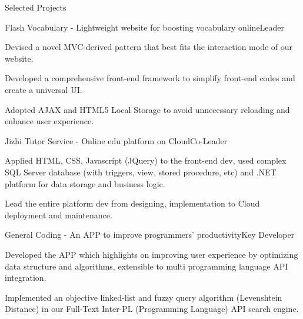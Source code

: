 \documentclass{resume} %
\begin{document}
\begin{rSection}{Selected Projects}

\begin{rSubsection}{Flash Vocabulary - Lightweight website for boosting vocabulary online}{Leader}{}{}
\item Devised a novel MVC-derived pattern that best fits the interaction mode of our website.
\item Developed a comprehensive front-end framework to simplify front-end codes and create a universal UI.
\item Adopted AJAX and HTML5 Local Storage to avoid unnecessary reloading and enhance user experience.
\end{rSubsection}


\begin{rSubsection}{Jizhi Tutor Service - Online edu platform on Cloud}{Co-Leader}{}{}
\item Applied HTML, CSS, Javascript (JQuery) to the front-end dev, used complex SQL Server database (with triggers, view, stored procedure, etc) and .NET platform for data storage and business logic.
\item Lead the entire platform dev from designing, implementation to Cloud deployment and maintenance.
\end{rSubsection}


\begin{rSubsection}{General Coding - An APP to improve programmers' productivity}{Key Developer}{}{}
\item Developed the APP which highlights on improving user experience by optimizing data structure and algorithms, extensible to multi programming language API integration.
\item Implemented an objective linked-list and fuzzy query algorithm (Levenshtein Distance) in our Full-Text
Inter-PL (Programming Language) API search engine.
\end{rSubsection}


\end{rSection}

\end{document}
